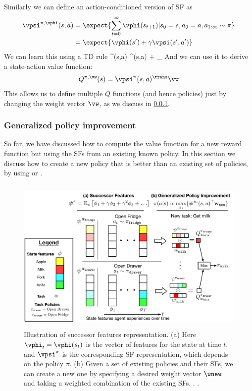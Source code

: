 Similarly we can define an action-conditioned version of SF as
\begin{align}
\vpsi^{\pi,\vphi}(s,a) &= \expect{
  \sum_{t=0}^{\infty} \vphi(s_{t+1}) \vert s_0=s, a_0=a, a_{1:\infty} \sim \pi} \\
&= \expect{\vphi(s') + \gamma \vpsi(s',a')}
\end{align}
We can learn this using a TD rule
\be
\vpsi^{\pi}(s,a) \leftarrow
\vpsi^{\pi}(s,a) + \eta {}_{\delta}
\label{eqn:SFTD}
\ee
And we can use it to derive a state-action value function:
\begin{align}
  Q^{\pi,\vw}(s)
  = \vpsi^{\pi}(s,a)^\trans \vw
\end{align}
This allows us to define multiple $Q$ functions (and hence policies)
just by changing the weight vector $\vw$, as we discuss in \cref{sec:GPI}.


\subsubsection{Generalized policy improvement}
\label{sec:GPI}

So far, we have discussed how to compute the value function
for a new reward function but using the SFs
from an existing known policy.
In this section we discuss how to create a new policy
that is better than an existing set of policies,
by using 
or  \citep{Barreto2017,Barreto2020}.



\begin{figure}
\centering
\includegraphics[height=3in]{figs/successor-features}
\caption{
  Illustration of successor features representation.
  (a)
  Here $\vphi_t=\vphi(s_t)$ is the vector of features
  for the state at time $t$, and $\vpsi^{\pi}$
  is the corresponding SF representation, which depends
  on the policy $\pi$.
  (b) Given a set of existing policies and their SFs,
  we can create a new one by specifying a desired
  weight vector $\wnew$ and taking a weighted combination
  of the existing SFs.
  .
    .
}
\label{fig:successorFeatures}
\end{figure}

